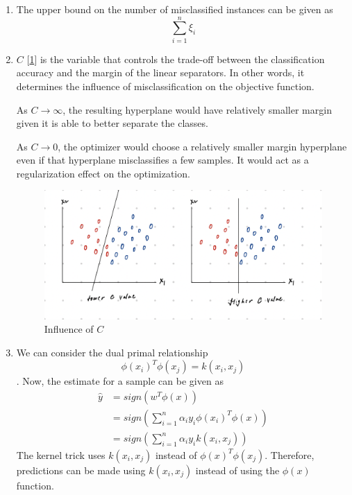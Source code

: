 \begin{enumerate}

    \item 
        The upper bound on the number of misclassified instances can be given as $$\sum_{i=1}^{n}\xi_{i}$$
        
    \item 
        $C$ [\ref{fig:3_a}] is the variable that controls the trade-off between the classification accuracy and the margin of the linear separators. In other words, it determines the influence of misclassification on the objective function.
    
        As $C \rightarrow \infty$, the resulting hyperplane would have relatively smaller margin given it is able to better separate the classes.
        
        As $C \rightarrow 0$, the optimizer would choose a relatively smaller margin hyperplane even if that hyperplane misclassifies a few samples. It would act as a regularization effect on the optimization.
    
        \begin{figure}[!ht]
            \centering
            \includegraphics[width=\textwidth]{images/problem_3_a}
            \caption{Influence of $C$}
            \label{fig:3_a}
        \end{figure}

    \item        
        We can consider the dual primal relationship $$\phi(x_{i})^{T}\phi(x_{j}) = k(x_{i}, x_{j})$$. Now, the estimate for a sample can be given as 
        \begin{align*}
            \hat{y} & = sign(w^{T}\phi(x)) \\
            & = sign(\sum_{i=1}^{n} \alpha_{i}y_{i}\phi(x_{i})^{T}\phi(x)) \\
            & = sign(\sum_{i=1}^{n} \alpha_{i}y_{i}k(x_{i}, x_{j}))
        \end{align*}
        The kernel trick uses $k(x_{i}, x_{j})$ instead of $\phi(x)^{T}\phi(x_{j})$. Therefore, predictions can be made using $k(x_{i}, x_{j})$ instead of using the $\phi(x)$ function.
        
        
\end{enumerate}